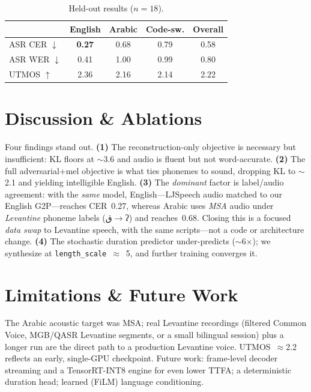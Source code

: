 \documentclass[10pt,twocolumn]{article}
\newcommand{\ar}[1]{\textarabic{#1}}        %
\newcommand{\ipa}[1]{{\ipafont #1}}          %
\begin{document}
\begin{table}[t]\centering\small
\caption{Held-out results ($n{=}18$).}
\label{tab:res}
\begin{tabular}{@{}lcccc@{}}
\toprule
& English & Arabic & Code-sw. & Overall\\
\midrule
ASR CER $\downarrow$ & \textbf{0.27} & 0.68 & 0.79 & 0.58\\
ASR WER $\downarrow$ & 0.41 & 1.00 & 0.99 & 0.80\\
UTMOS $\uparrow$ & 2.36 & 2.16 & 2.14 & 2.22\\
\bottomrule
\end{tabular}
\end{table}

\section{Discussion \& Ablations}\label{sec:disc}
Four findings stand out. \textbf{(1)} The reconstruction-only objective is necessary but
insufficient: KL floors at $\sim$3.6 and audio is fluent but not word-accurate.
\textbf{(2)} The full adversarial+mel objective is what ties phonemes to sound, dropping
KL to $\sim$2.1 and yielding intelligible English. \textbf{(3)} The \emph{dominant} factor
is label/audio agreement: with the \emph{same} model, English---LJSpeech audio matched to
our English G2P---reaches CER~0.27, whereas Arabic uses \emph{MSA} audio under
\emph{Levantine} phoneme labels (\ar{ق}$\rightarrow$\ipa{ʔ}) and reaches~0.68. Closing
this is a focused \emph{data swap} to Levantine speech, with the same scripts---not a code
or architecture change. \textbf{(4)} The stochastic duration predictor under-predicts
($\sim$6$\times$); we synthesize at \texttt{length\_scale}~$\approx$~5, and further training
converges it.

\section{Limitations \& Future Work}
The Arabic acoustic target was MSA; real Levantine recordings (filtered Common Voice,
MGB/QASR Levantine segments, or a small bilingual session) plus a longer run are the
direct path to a production Levantine voice. UTMOS~$\approx$2.2 reflects an early,
single-GPU checkpoint. Future work: frame-level decoder streaming and a TensorRT-INT8
engine for even lower TTFA; a deterministic duration head; learned (FiLM) language
conditioning.
\end{document}
